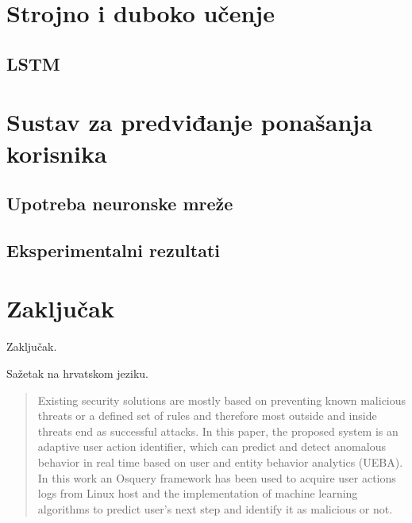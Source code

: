 \documentclass[times, utf8, diplomski]{fer}
\begin{document}
\chapter{Strojno i duboko učenje}
\section{LSTM}

\chapter{Sustav za predviđanje ponašanja korisnika}
\section{Upotreba neuronske mreže}
\section{Eksperimentalni rezultati}

\chapter{Zaključak}
Zaključak.




\begin{sazetak}
Sažetak na hrvatskom jeziku.

\end{sazetak}

\begin{abstract}
Existing security solutions are mostly based on preventing known malicious threats or a defined set of rules and therefore most outside and inside threats end as successful attacks. In this paper, the proposed system is an adaptive user action identifier, which can predict and detect anomalous behavior in real time based on user and entity behavior analytics (UEBA). In this work an Osquery framework has been used to acquire user actions logs from Linux host and the implementation of machine learning algorithms to predict user's next step and identify it as malicious or not. 

\end{abstract}
\end{document}
